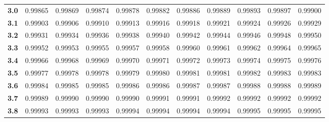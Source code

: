 \begin{center}
\begin{tabular}{c|c|c|c|c|c|c|c|c|c|c}
\textbf{3.0} & 0.99865 & 0.99869 & 0.99874 & 0.99878 & 0.99882 & 0.99886 & 0.99889 & 0.99893 & 0.99897 & 0.99900 \\
\textbf{3.1} & 0.99903 & 0.99906 & 0.99910 & 0.99913 & 0.99916 & 0.99918 & 0.99921 & 0.99924 & 0.99926 & 0.99929 \\
\textbf{3.2} & 0.99931 & 0.99934 & 0.99936 & 0.99938 & 0.99940 & 0.99942 & 0.99944 & 0.99946 & 0.99948 & 0.99950 \\
\textbf{3.3} & 0.99952 & 0.99953 & 0.99955 & 0.99957 & 0.99958 & 0.99960 & 0.99961 & 0.99962 & 0.99964 & 0.99965 \\
\textbf{3.4} & 0.99966 & 0.99968 & 0.99969 & 0.99970 & 0.99971 & 0.99972 & 0.99973 & 0.99974 & 0.99975 & 0.99976 \\
\textbf{3.5} & 0.99977 & 0.99978 & 0.99978 & 0.99979 & 0.99980 & 0.99981 & 0.99981 & 0.99982 & 0.99983 & 0.99983 \\
\textbf{3.6} & 0.99984 & 0.99985 & 0.99985 & 0.99986 & 0.99986 & 0.99987 & 0.99987 & 0.99988 & 0.99988 & 0.99989 \\
\textbf{3.7} & 0.99989 & 0.99990 & 0.99990 & 0.99990 & 0.99991 & 0.99991 & 0.99992 & 0.99992 & 0.99992 & 0.99992 \\
\textbf{3.8} & 0.99993 & 0.99993 & 0.99993 & 0.99994 & 0.99994 & 0.99994 & 0.99994 & 0.99995 & 0.99995 & 0.99995 \bstrut\\
\hline
\end{tabular}
\end{center}

\clearpage %